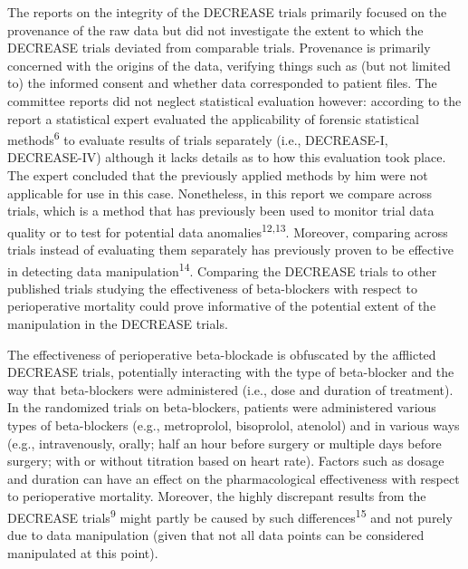 \documentclass[]{article}
\begin{document}
The reports on the integrity of the DECREASE trials primarily focused on
the provenance of the raw data but did not investigate the extent to
which the DECREASE trials deviated from comparable trials. Provenance is
primarily concerned with the origins of the data, verifying things such
as (but not limited to) the informed consent and whether data
corresponded to patient files. The committee reports did not neglect
statistical evaluation however: according to the report a statistical
expert evaluated the applicability of forensic statistical
methods\textsuperscript{6} to evaluate results of trials separately
(i.e., DECREASE-I, DECREASE-IV) although it lacks details as to how this
evaluation took place. The expert concluded that the previously applied
methods by him were not applicable for use in this case. Nonetheless, in
this report we compare across trials, which is a method that has
previously been used to monitor trial data quality or to test for
potential data anomalies\textsuperscript{12,13}. Moreover, comparing
across trials instead of evaluating them separately has previously
proven to be effective in detecting data
manipulation\textsuperscript{14}. Comparing the DECREASE trials to other
published trials studying the effectiveness of beta-blockers with
respect to perioperative mortality could prove informative of the
potential extent of the manipulation in the DECREASE trials.

The effectiveness of perioperative beta-blockade is obfuscated by the
afflicted DECREASE trials, potentially interacting with the type of
beta-blocker and the way that beta-blockers were administered (i.e.,
dose and duration of treatment). In the randomized trials on
beta-blockers, patients were administered various types of beta-blockers
(e.g., metroprolol, bisoprolol, atenolol) and in various ways (e.g.,
intravenously, orally; half an hour before surgery or multiple days
before surgery; with or without titration based on heart rate). Factors
such as dosage and duration can have an effect on the pharmacological
effectiveness with respect to perioperative mortality. Moreover, the
highly discrepant results from the DECREASE trials\textsuperscript{9}
might partly be caused by such differences\textsuperscript{15} and not
purely due to data manipulation (given that not all data points can be
considered manipulated at this point).
\end{document}
